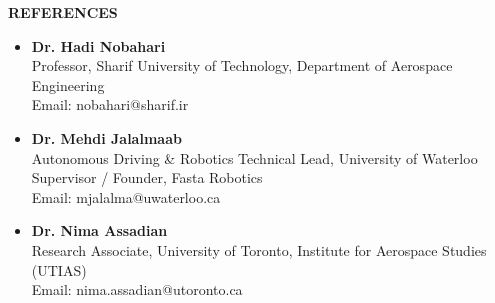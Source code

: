 \documentclass[12pt]{article}
\begin{document}
\newpage
\begin{center}
    {\noindent \bfseries REFERENCES}
\end{center}

\vspace{-8pt}
\begin{itemize}
    \item \textbf{Dr. Hadi Nobahari} \\
    Professor, Sharif University of Technology, Department of Aerospace Engineering \\
    Email: nobahari@sharif.ir
	\item \textbf{Dr. Mehdi Jalalmaab} \\
	Autonomous Driving \& Robotics Technical Lead, University of Waterloo \\
	Supervisor / Founder, Fasta Robotics \\
	Email: mjalalma@uwaterloo.ca
	\item \textbf{Dr. Nima Assadian} \\
    Research Associate, University of Toronto, Institute for Aerospace Studies (UTIAS) \\
    Email: nima.assadian@utoronto.ca

\end{itemize}
\end{document}
